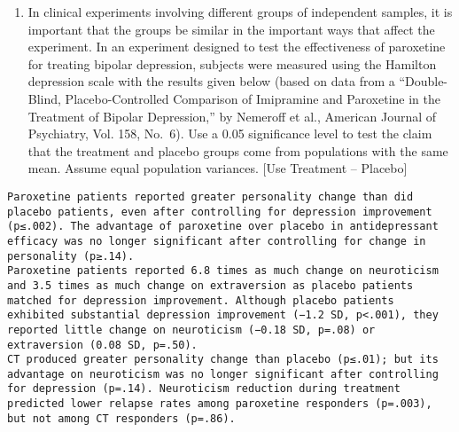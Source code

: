 \documentclass[
]{article}
\providecommand{\tightlist}{%
  \setlength{\itemsep}{0pt}\setlength{\parskip}{0pt}}
\begin{document}
\begin{enumerate}
\def\labelenumi{\arabic{enumi}.}
\setcounter{enumi}{5}
\tightlist
\item
  In clinical experiments involving different groups of independent
  samples, it is important that the groups be similar in the important
  ways that affect the experiment. In an experiment designed to test the
  effectiveness of paroxetine for treating bipolar depression, subjects
  were measured using the Hamilton depression scale with the results
  given below (based on data from a ``Double-Blind, Placebo-Controlled
  Comparison of Imipramine and Paroxetine in the Treatment of Bipolar
  Depression,'' by Nemeroff et al., American Journal of Psychiatry, Vol.
  158, No.~6). Use a 0.05 significance level to test the claim that the
  treatment and placebo groups come from populations with the same mean.
  Assume equal population variances. {[}Use Treatment -- Placebo{]}
\end{enumerate}

\begin{verbatim}
Paroxetine patients reported greater personality change than did placebo patients, even after controlling for depression improvement (p≤.002). The advantage of paroxetine over placebo in antidepressant efficacy was no longer significant after controlling for change in personality (p≥.14).
Paroxetine patients reported 6.8 times as much change on neuroticism and 3.5 times as much change on extraversion as placebo patients matched for depression improvement. Although placebo patients exhibited substantial depression improvement (−1.2 SD, p<.001), they reported little change on neuroticism (−0.18 SD, p=.08) or extraversion (0.08 SD, p=.50).
CT produced greater personality change than placebo (p≤.01); but its advantage on neuroticism was no longer significant after controlling for depression (p=.14). Neuroticism reduction during treatment predicted lower relapse rates among paroxetine responders (p=.003), but not among CT responders (p=.86).
\end{verbatim}
\end{document}
